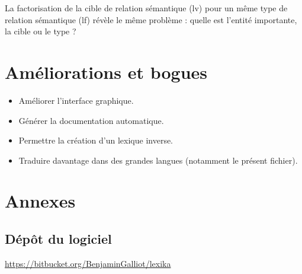 \documentclass[10pt]{report}
\begin{document}
\bigskip

La factorisation de la cible de relation sémantique (lv) pour un même type de relation sémantique (lf) révèle le même problème : quelle est l’entité importante, la cible ou le type ?


\chapter{Améliorations et bogues}

\begin{itemize}
    \item Améliorer l’interface graphique.
    \item Générer la documentation automatique.
    \item Permettre la création d’un lexique inverse.
    \item Traduire davantage dans des grandes langues (notamment le présent fichier).
\end{itemize}

\chapter{Annexes}

\section{Dépôt du logiciel}

\url{https://bitbucket.org/BenjaminGalliot/lexika}
\end{document}
